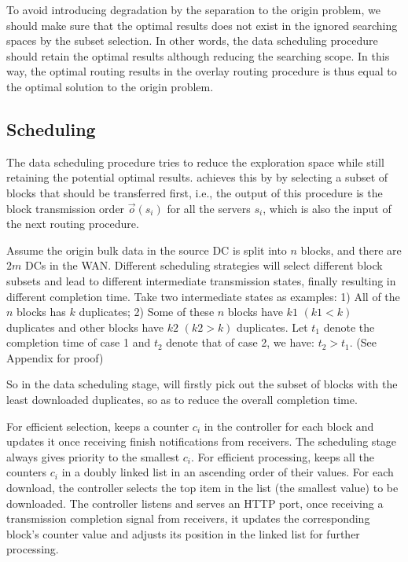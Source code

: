To avoid introducing degradation by the separation to the origin problem, we should make sure that the optimal results does not exist in the ignored searching spaces by the subset selection. In other words, the data scheduling procedure should retain the optimal results although reducing the searching scope. In this way, the optimal routing results in the overlay routing procedure is thus equal to the optimal solution to the origin problem.

\subsection{Scheduling}
\label{subsec:logic:scheduling}

The data scheduling procedure tries to reduce the exploration space while still retaining the potential optimal results. \name achieves this by by selecting a subset of blocks that should be transferred first, i.e., the output of this procedure is the block transmission order $\overrightarrow{o}(s_i)$ for all the servers $s_i$, which is also the input of the next routing procedure.

Assume the origin bulk data in the source DC is split into $n$ blocks, and there are $2m$ DCs in the WAN. Different scheduling strategies will select different block subsets and lead to different intermediate transmission states, finally resulting in different completion time. Take two intermediate states as examples: 1) All of the $n$ blocks has $k$ duplicates; 2) Some of these $n$ blocks have $k1$ $(k1<k)$ duplicates and other blocks have $k2$ $(k2>k)$ duplicates. Let $t_1$ denote the completion time of case 1 and $t_2$ denote that of case 2, we have: $t_2 > t_1$. (See Appendix for proof)

So in the data scheduling stage, \name will firstly pick out the subset of blocks with the least downloaded duplicates, so as to reduce the overall completion time.

For efficient selection, \name keeps a counter $c_i$ in the controller for each block and updates it once receiving finish notifications from receivers. The scheduling stage always gives priority to the smallest $c_i$. For efficient processing, \name keeps all the counters $c_i$ in a doubly linked list in an ascending order of their values. For each download, the controller selects the top item in the list (the smallest value) to be downloaded. The controller listens and serves an HTTP port, once receiving a transmission completion signal from receivers, it updates the corresponding block's counter value and adjusts its position in the linked list for further processing.

